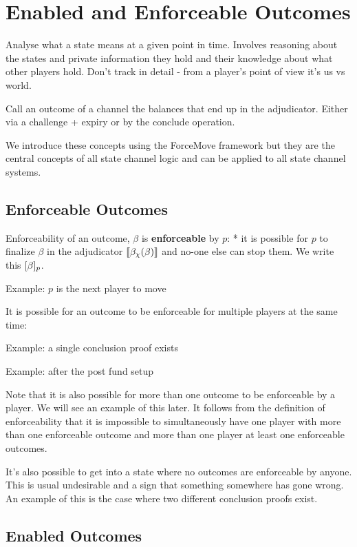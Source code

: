 \section{Enabled and Enforceable Outcomes}

Analyse what a state means at a given point in time. Involves reasoning about the states and private information they hold and their knowledge about what other players hold. Don't track in detail - from a player's point of view it's us vs world.

Call an outcome of a channel the balances that end up in the adjudicator. Either via a challenge + expiry or by the conclude operation.

We introduce these concepts using the ForceMove framework but they are the central concepts of all state channel logic and can be applied to all state channel systems.

\subsection{Enforceable Outcomes}

Enforceability of an outcome, $\beta$ is \textbf{enforceable} by $p$:
* it is possible for $p$ to finalize $\beta$ in the adjudicator $\llbracket \beta_\chi(\beta) \rrbracket$ and no-one else can stop them. We write this $[\beta]_p$.

Example: $p$ is the next player to move

It is possible for an outcome to be enforceable for multiple players at the same time:

Example: a single conclusion proof exists

Example: after the post fund setup

Note that it is also possible for more than one outcome to be enforceable by a player. We will see an example of this later. It follows from the definition of enforceability that it is impossible to simultaneously have one player with more than one enforceable outcome and more than one player at least one enforceable outcomes. 

It's also possible to get into a state where no outcomes are enforceable by anyone. This is usual undesirable and a sign that something somewhere has gone wrong. An example of this is the case where two different conclusion proofs exist.


\subsection{Enabled Outcomes}

